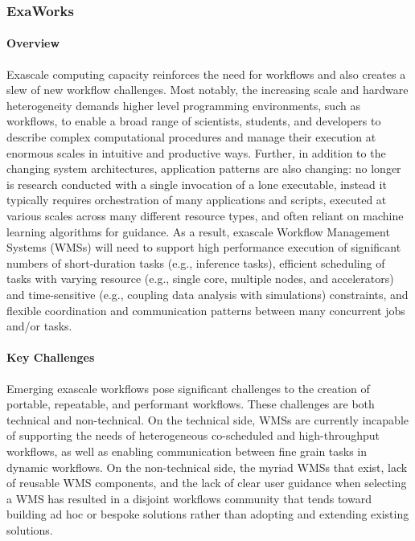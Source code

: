 
\subsubsection{ ExaWorks} \label{subsubsect:exaworks}


\paragraph{Overview} Exascale computing capacity reinforces the need for workflows and also creates
a slew of new workflow challenges. Most notably, the increasing scale and
hardware heterogeneity demands higher level programming environments, such as
workflows, to enable a broad range of scientists, students, and developers to
describe complex computational procedures and manage their execution at
enormous scales in intuitive and productive ways. Further, in addition to the
changing system architectures, application patterns are also changing: no
longer is research conducted with a single invocation of a lone executable,
instead it typically requires orchestration of many applications and scripts,
executed at various scales across many different resource types, and often
reliant on machine learning algorithms for guidance. As a result, exascale
Workflow Management Systems (WMSs) will need to support high performance
execution of significant numbers of short-duration tasks (e.g., inference
tasks), efficient scheduling of tasks with varying resource (e.g., single
core, multiple nodes, and accelerators) and time-sensitive (e.g., coupling
data analysis with simulations) constraints, and flexible coordination and
communication patterns between many concurrent jobs and/or tasks.


\paragraph{Key Challenges}
Emerging exascale workflows pose significant challenges to the creation of
portable, repeatable, and performant workflows. These challenges are both
technical and non-technical. On the technical side, WMSs are currently
incapable of supporting the needs of heterogeneous co-scheduled and
high-throughput workflows, as well as enabling communication between fine
grain tasks in dynamic workflows. On the non-technical side, the myriad WMSs
that exist, lack of reusable WMS components, and the lack of clear user
guidance when selecting a WMS has resulted in a disjoint workflows community
that tends toward building ad hoc or bespoke solutions rather than adopting
and extending existing solutions.

